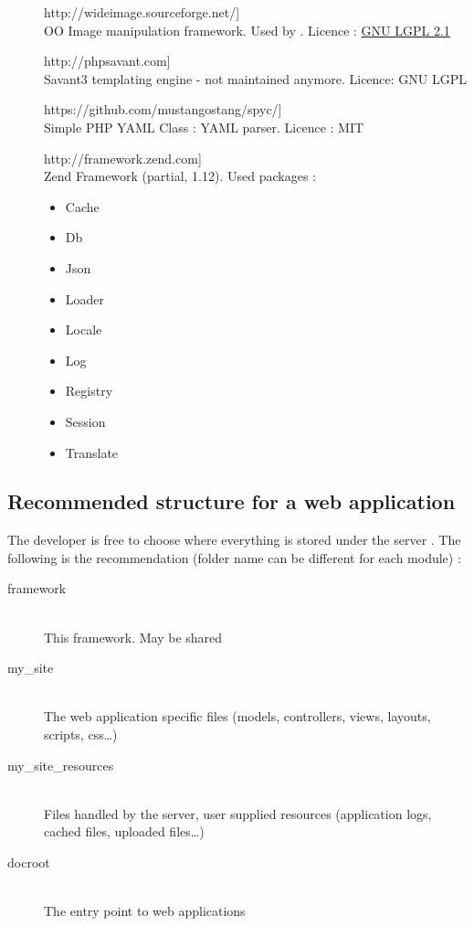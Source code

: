 \documentclass[pdftex,12pt,a4paper]{article}
\begin{document}
\begin{description}
    \item[\url[WideImage]{http://wideimage.sourceforge.net/}] \hfill \\
OO Image manipulation framework. Used by . Licence : \href{http://wideimage.sourceforge.net/license/}{GNU LGPL 2.1}
    \item[\url[savant3]{http://phpsavant.com}] \hfill \\
Savant3 templating engine - not maintained anymore. Licence: GNU LGPL
    \item[\url[spyc]{https://github.com/mustangostang/spyc/}] \hfill \\
Simple PHP YAML Class : YAML parser. Licence : MIT
    \item[\url[Zend]{http://framework.zend.com}] \hfill \\
Zend Framework (partial, 1.12). Used packages :
        \begin{itemize}
            \item{Cache}
            \item{Db}
            \item{Json}
            \item{Loader}
            \item{Locale}
            \item{Log}
            \item{Registry}
            \item{Session}
            \item{Translate}
        \end{itemize}
\end{description}

\subsection{Recommended structure for a web application}
The developer is free to choose where everything is stored under the server .
The following is the recommendation (folder name can be different for each module) :
\begin{description}
    \item[framework] \hfill \\
This framework. May be shared
    \item[my\_site] \hfill \\
The web application specific files (models, controllers, views, layouts, scripts, css\ldots)
    \item[my\_site\_resources] \hfill \\
Files handled by the server, user supplied resources (application logs, cached files, uploaded files\ldots)
    \item[docroot] \hfill \\
The entry point to web applications
\end{description}
\end{document}
